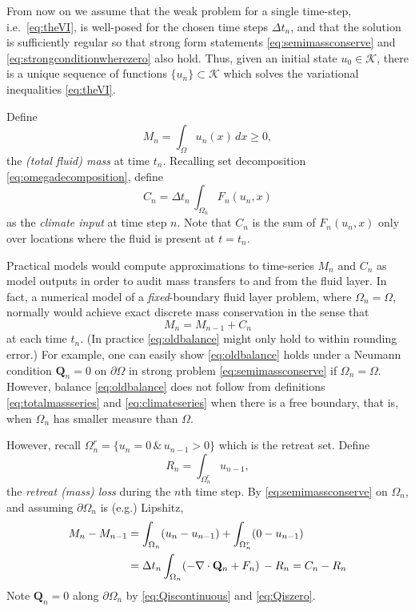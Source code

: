\documentclass[final,onefignum]{siamart190516}
\newcommand\bQ{\mathbf{Q}}
\newcommand{\Div}{\nabla\cdot}
\begin{document}
From now on we assume that the weak problem for a single time-step, i.e.~\eqref{eq:theVI}, is well-posed for the chosen time steps $\Delta t_n$, and that the solution is sufficiently regular so that strong form statements \eqref{eq:semimassconserve} and \eqref{eq:strongconditionwherezero} also hold.  Thus, given an initial state $u_0\in\mathcal{K}$, there is a unique sequence of functions $\{u_n\} \subset \mathcal{K}$ which solves the variational inequalities \eqref{eq:theVI}.

Define
\begin{equation}
M_n = \int_\Omega u_n(x)\,dx \ge 0, \label{eq:totalmassseries}
\end{equation}
the \emph{(total fluid) mass} at time $t_n$.  Recalling set decomposition \eqref{eq:omegadecomposition}, define
\begin{equation}
C_n = \Delta t_n\, \int_{\Omega_n} F_n(u_n,x) \label{eq:climateseries}
\end{equation}
as the \emph{climate input} at time step $n$.  Note that $C_n$ is the sum of $F_n(u_n,x)$ only over locations where the fluid is present at $t=t_n$.

Practical models would compute approximations to time-series $M_n$ and $C_n$ as model outputs in order to audit mass transfers to and from the fluid layer.  In fact, a numerical model of a \emph{fixed}-boundary fluid layer problem, where $\Omega_n=\Omega$, normally would achieve exact discrete mass conservation in the sense that
\begin{equation}
M_n = M_{n-1} + C_n \label{eq:oldbalance}
\end{equation}
at each time $t_n$.  (In practice \eqref{eq:oldbalance} might only hold to within rounding error.)  For example, one can easily show \eqref{eq:oldbalance} holds under a Neumann condition $\bQ_n=0$ on $\partial \Omega$ in strong problem \eqref{eq:semimassconserve} if $\Omega_n=\Omega$.  However, balance \eqref{eq:oldbalance} does not follow from definitions \eqref{eq:totalmassseries} and \eqref{eq:climateseries} when there is a free boundary, that is, when $\Omega_n$ has smaller measure than $\Omega$.

However, recall $\Omega_n^r=\{u_n = 0 \,\&\,u_{n-1}>0\}$ which is the retreat set.  Define
\begin{equation}
R_n = \int_{\Omega_n^r} u_{n-1}, \label{eq:retreatlossseries}
\end{equation}
the \emph{retreat (mass) loss} during the $n$th time step.  By \eqref{eq:semimassconserve} on $\Omega_n$, and assuming $\partial \Omega_n$ is (e.g.) Lipshitz,
\begin{align}
M_n - M_{n-1} &= \int_{\Omega_n} (u_n - u_{n-1}) + \int_{\Omega_n^r} (0 - u_{n-1}) \label{eq:newbalance} \\
   &= \Delta t_n \int_{\Omega_n} (- \Div \bQ_n + F_n) \, - R_n = C_n - R_n \notag
\end{align}
Note $\bQ_n=0$ along $\partial \Omega_n$ by \eqref{eq:Qiscontinuous} and \eqref{eq:Qiszero}.
\end{document}
